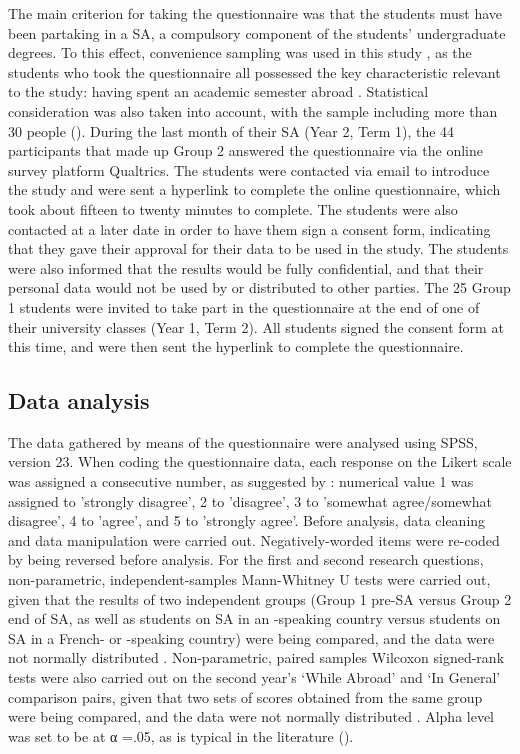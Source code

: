 \documentclass[output=paper]{langsci/langscibook}
\begin{document}
The main criterion for taking the questionnaire was that the students must have been partaking in a SA, a compulsory component of the students’ undergraduate degrees. To this effect, convenience sampling was used in this study \citep{Dörnyei2007}, as the students who took the questionnaire all possessed the key characteristic relevant to the study: having spent an academic semester abroad \citep{Aiken1997}. Statistical consideration was also taken into account, with the sample including more than 30 people (\citealt{HatchLazaraton1991}). During the last month of their SA (Year 2, Term 1), the 44 participants that made up Group 2 answered the questionnaire via the online survey platform Qualtrics. The students were contacted via email to introduce the study and were sent a hyperlink to complete the online questionnaire, which took about fifteen to twenty minutes to complete. The students were also contacted at a later date in order to have them sign a consent form, indicating that they gave their approval for their data to be used in the study. The students were also informed that the results would be fully confidential, and that their personal data would not be used by or distributed to other parties.  The 25 Group 1 students were invited to take part in the questionnaire at the end of one of their university classes (Year 1, Term 2). All students signed the consent form at this time, and were then sent the hyperlink to complete the questionnaire.

 
\subsection{Data analysis}


The data gathered by means of the questionnaire were analysed using SPSS, version 23. When coding the questionnaire data, each response on the Likert scale was assigned a consecutive number, as suggested by \citet{DörnyeiCsizér2012}: numerical value 1 was assigned to 'strongly disagree', 2 to 'disagree', 3 to 'somewhat agree/somewhat disagree', 4 to 'agree', and 5 to 'strongly agree'. Before analysis, data cleaning and data manipulation were carried out. Negatively-worded items were re-coded by being reversed before analysis. For the first and second research questions, non-parametric, independent-samples Mann-Whitney U tests were carried out, given that the results of two independent groups (Group 1 pre-SA versus Group 2 end of SA, as well as students on SA in an -speaking country versus students on SA in a French- or -speaking country) were being compared, and the data were not normally distributed \citep{Dörnyei2007}. Non-parametric, paired samples Wilcoxon signed-rank tests were also carried out on the second year’s ‘While  {Abroad}’ and ‘In General’ comparison pairs, given that two sets of scores obtained from the same group were being compared, and the data were not normally distributed \citep{Dörnyei2007}. Alpha level was set to be at α =.05, as is typical in the  literature (\citealt{Larson-Hall2012}).  
\end{document}
